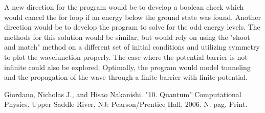 \documentclass[12pt]{article}                  %
\begin{document}
A new direction for the program would be to develop a boolean check which would cancel the for loop if an energy below the ground state was found. Another direction would be to develop the program to solve for the odd energy levels. The methods for this solution would be similar, but would rely on using the "shoot and match" method on a different set of initial conditions and utilizing symmetry to plot the wavefunction properly. The case where the potential barrier is not infinite could also be explored. Optimally, the program would model tunneling and the propagation of the wave through a finite barrier with finite potential. 


\begin{thebibliography}{9}

Giordano, Nicholas J., and Hisao Nakanishi. "10. Quantum" Computational Physics. Upper Saddle River, NJ: Pearson/Prentice Hall, 2006. N. pag. Print.


\end{thebibliography}

\pagebreak
\end{document}

